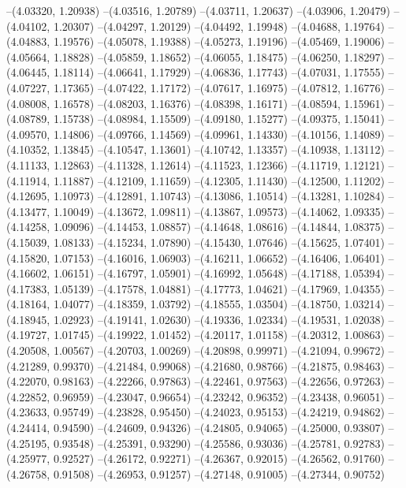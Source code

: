 --(4.03320, 1.20938)
--(4.03516, 1.20789)
--(4.03711, 1.20637)
--(4.03906, 1.20479)
--(4.04102, 1.20307)
--(4.04297, 1.20129)
--(4.04492, 1.19948)
--(4.04688, 1.19764)
--(4.04883, 1.19576)
--(4.05078, 1.19388)
--(4.05273, 1.19196)
--(4.05469, 1.19006)
--(4.05664, 1.18828)
--(4.05859, 1.18652)
--(4.06055, 1.18475)
--(4.06250, 1.18297)
--(4.06445, 1.18114)
--(4.06641, 1.17929)
--(4.06836, 1.17743)
--(4.07031, 1.17555)
--(4.07227, 1.17365)
--(4.07422, 1.17172)
--(4.07617, 1.16975)
--(4.07812, 1.16776)
--(4.08008, 1.16578)
--(4.08203, 1.16376)
--(4.08398, 1.16171)
--(4.08594, 1.15961)
--(4.08789, 1.15738)
--(4.08984, 1.15509)
--(4.09180, 1.15277)
--(4.09375, 1.15041)
--(4.09570, 1.14806)
--(4.09766, 1.14569)
--(4.09961, 1.14330)
--(4.10156, 1.14089)
--(4.10352, 1.13845)
--(4.10547, 1.13601)
--(4.10742, 1.13357)
--(4.10938, 1.13112)
--(4.11133, 1.12863)
--(4.11328, 1.12614)
--(4.11523, 1.12366)
--(4.11719, 1.12121)
--(4.11914, 1.11887)
--(4.12109, 1.11659)
--(4.12305, 1.11430)
--(4.12500, 1.11202)
--(4.12695, 1.10973)
--(4.12891, 1.10743)
--(4.13086, 1.10514)
--(4.13281, 1.10284)
--(4.13477, 1.10049)
--(4.13672, 1.09811)
--(4.13867, 1.09573)
--(4.14062, 1.09335)
--(4.14258, 1.09096)
--(4.14453, 1.08857)
--(4.14648, 1.08616)
--(4.14844, 1.08375)
--(4.15039, 1.08133)
--(4.15234, 1.07890)
--(4.15430, 1.07646)
--(4.15625, 1.07401)
--(4.15820, 1.07153)
--(4.16016, 1.06903)
--(4.16211, 1.06652)
--(4.16406, 1.06401)
--(4.16602, 1.06151)
--(4.16797, 1.05901)
--(4.16992, 1.05648)
--(4.17188, 1.05394)
--(4.17383, 1.05139)
--(4.17578, 1.04881)
--(4.17773, 1.04621)
--(4.17969, 1.04355)
--(4.18164, 1.04077)
--(4.18359, 1.03792)
--(4.18555, 1.03504)
--(4.18750, 1.03214)
--(4.18945, 1.02923)
--(4.19141, 1.02630)
--(4.19336, 1.02334)
--(4.19531, 1.02038)
--(4.19727, 1.01745)
--(4.19922, 1.01452)
--(4.20117, 1.01158)
--(4.20312, 1.00863)
--(4.20508, 1.00567)
--(4.20703, 1.00269)
--(4.20898, 0.99971)
--(4.21094, 0.99672)
--(4.21289, 0.99370)
--(4.21484, 0.99068)
--(4.21680, 0.98766)
--(4.21875, 0.98463)
--(4.22070, 0.98163)
--(4.22266, 0.97863)
--(4.22461, 0.97563)
--(4.22656, 0.97263)
--(4.22852, 0.96959)
--(4.23047, 0.96654)
--(4.23242, 0.96352)
--(4.23438, 0.96051)
--(4.23633, 0.95749)
--(4.23828, 0.95450)
--(4.24023, 0.95153)
--(4.24219, 0.94862)
--(4.24414, 0.94590)
--(4.24609, 0.94326)
--(4.24805, 0.94065)
--(4.25000, 0.93807)
--(4.25195, 0.93548)
--(4.25391, 0.93290)
--(4.25586, 0.93036)
--(4.25781, 0.92783)
--(4.25977, 0.92527)
--(4.26172, 0.92271)
--(4.26367, 0.92015)
--(4.26562, 0.91760)
--(4.26758, 0.91508)
--(4.26953, 0.91257)
--(4.27148, 0.91005)
--(4.27344, 0.90752)
